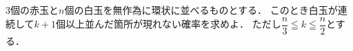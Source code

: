 \documentclass[../../main.tex]{subfiles}
\begin{document}
3個の赤玉と$n$個の白玉を無作為に環状に並べるものとする．
このとき白玉が連続して$k+1$個以上並んだ箇所が現れない確率を求めよ．
ただし$\displaystyle \dfrac{n}{3} \leqq k \leqq \dfrac{n}{2}$とする．
\end{document}
